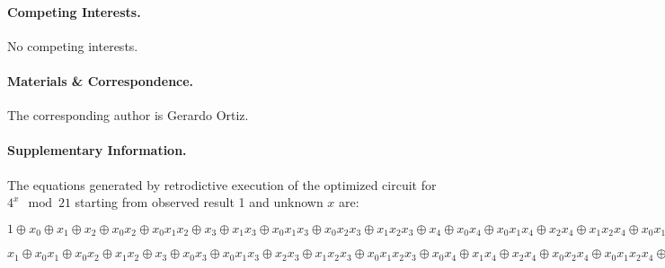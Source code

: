 \documentclass{article}
\begin{document}
\begin{refsection}
\paragraph*{Competing Interests.}
No competing interests.

\paragraph*{Materials \& Correspondence.}
The corresponding author is Gerardo Ortiz. 

\paragraph*{Supplementary Information.} 
\label{par:shor21}

The equations generated by retrodictive execution of the optimized
circuit for $4^x \mod{21}$ starting from observed result 1 and unknown
$x$ are:

\bigskip

$1 \oplus x_0 \oplus x_1 \oplus x_2 \oplus x_0x_2 \oplus x_0x_1x_2
\oplus x_3 \oplus x_1x_3 \oplus x_0x_1x_3 \oplus x_0x_2x_3 \oplus
x_1x_2x_3 \oplus x_4 \oplus x_0x_4 \oplus x_0x_1x_4 \oplus x_2x_4
\oplus x_1x_2x_4 \oplus x_0x_1x_2x_4 \oplus x_0x_3x_4 \oplus x_1x_3x_4
\oplus x_2x_3x_4 \oplus x_0x_2x_3x_4 \oplus x_0x_1x_2x_3x_4 \oplus x_5
\oplus x_1x_5 \oplus x_0x_1x_5 \oplus x_0x_2x_5 \oplus x_1x_2x_5
\oplus x_3x_5 \oplus x_0x_3x_5 \oplus x_0x_1x_3x_5 \oplus x_2x_3x_5
\oplus x_1x_2x_3x_5 \oplus x_0x_1x_2x_3x_5 \oplus x_0x_4x_5 \oplus
x_1x_4x_5 \oplus x_2x_4x_5 \oplus x_0x_2x_4x_5 \oplus x_0x_1x_2x_4x_5
\oplus x_3x_4x_5 \oplus x_1x_3x_4x_5 \oplus x_0x_1x_3x_4x_5 \oplus
x_0x_2x_3x_4x_5 \oplus x_1x_2x_3x_4x_5 = 1$

\bigskip

$x_1 \oplus x_0x_1 \oplus x_0x_2 \oplus x_1x_2 \oplus x_3 \oplus
x_0x_3 \oplus x_0x_1x_3 \oplus x_2x_3 \oplus x_1x_2x_3 \oplus
x_0x_1x_2x_3 \oplus x_0x_4 \oplus x_1x_4 \oplus x_2x_4 \oplus
x_0x_2x_4 \oplus x_0x_1x_2x_4 \oplus x_3x_4 \oplus x_1x_3x_4 \oplus
x_0x_1x_3x_4 \oplus x_0x_2x_3x_4 \oplus x_1x_2x_3x_4 \oplus x_5 \oplus
x_0x_5 \oplus x_0x_1x_5 \oplus x_2x_5 \oplus x_1x_2x_5 \oplus
x_0x_1x_2x_5 \oplus x_0x_3x_5 \oplus x_1x_3x_5 \oplus x_2x_3x_5 \oplus
x_0x_2x_3x_5 \oplus x_0x_1x_2x_3x_5 \oplus x_4x_5 \oplus x_1x_4x_5
\oplus x_0x_1x_4x_5 \oplus x_0x_2x_4x_5 \oplus x_1x_2x_4x_5 \oplus
x_3x_4x_5 \oplus x_0x_3x_4x_5 \oplus x_0x_1x_3x_4x_5 \oplus
x_2x_3x_4x_5 \oplus x_1x_2x_3x_4x_5 \oplus x_0x_1x_2x_3x_4x_5 = 0$


\end{refsection}
\end{document}
